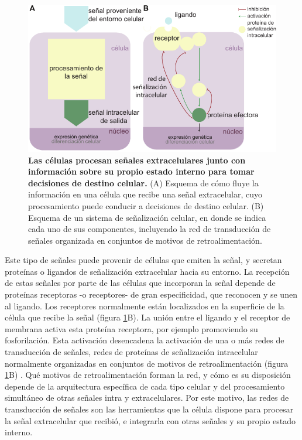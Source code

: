 \documentclass[./main.tex]{subfiles}
\begin{document}
 \begin{figure}
    \centering
    \includegraphics[width=1\columnwidth]{figures/chapter1/C1_signalling.pdf} 
    \caption{\textbf{Las células procesan señales extracelulares junto con información sobre su propio estado interno para tomar decisiones de destino celular.} (A)  Esquema de cómo fluye la información en una célula que recibe una señal extracelular, cuyo procesamiento puede conducir a decisiones de destino celular. (B) Esquema de un sistema de señalización celular, en donde se indica cada uno de sus componentes, incluyendo la red de transducción de señales organizada en conjuntos de motivos de retroalimentación.}
    \label{C1_fig:signalling}
\end{figure}

Este tipo de señales puede provenir de células que emiten la señal, y secretan proteínas o ligandos de señalización extracelular hacia su entorno. La recepción de estas señales por parte de las células que incorporan la señal depende de proteínas receptoras -o receptores- de gran especificidad, que reconocen y se unen al ligando. Los receptores normalmente están localizados en la superficie de la célula que recibe la señal (figura \ref{C1_fig:signalling}B). La unión entre el ligando y el receptor de membrana activa esta proteína receptora, por ejemplo promoviendo su fosforilación. Esta activación desencadena la activación de una o más redes de transducción de señales, redes de proteínas de señalización intracelular normalmente organizadas en conjuntos de motivos de retroalimentación (figura \ref{C1_fig:signalling}B) \cite{Alon2006,Shen2002,Milo2002,Tyson2003,Tyson2010,Alon2007}. Qué motivos de retroalimentación forman la red, y cómo es su disposición depende de la arquitectura específica de cada tipo celular y del procesamiento simultáneo de otras señales intra y extracelulares. Por este motivo, las redes de transducción de señales son las herramientas que la célula dispone para procesar la señal extracelular que recibió, e integrarla con otras señales y su propio estado interno. 
\end{document}

